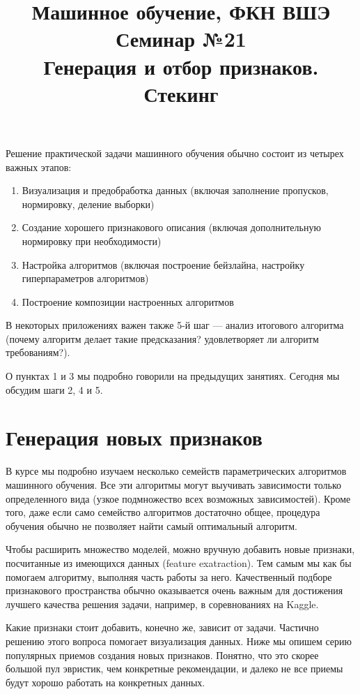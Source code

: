 \documentclass[12pt,a4paper]{article}
\title{Машинное обучение, ФКН ВШЭ\\Семинар №21\\Генерация и отбор признаков. Стекинг}
\author{}
\date{}
\begin{document}
	\maketitle
	Решение практической задачи машинного обучения обычно состоит из четырех  важных этапов:
	\begin{enumerate}
		\item Визуализация и предобработка данных (включая заполнение пропусков, нормировку, деление выборки)
		\item Создание хорошего признакового описания (включая дополнительную нормировку при необходимости)
		\item Настройка алгоритмов (включая построение бейзлайна, настройку гиперпараметров алгоритмов)
		\item Построение композиции настроенных алгоритмов
	\end{enumerate}
    В некоторых приложениях важен также 5-й шаг --- анализ итогового алгоритма (почему алгоритм делает такие предсказания? удовлетворяет ли алгоритм требованиям?).
    
    О пунктах 1 и 3 мы подробно говорили на предыдущих занятиях. Сегодня мы обсудим шаги 2, 4 и 5.
    
	\section{Генерация новых признаков}
	В курсе мы подробно изучаем несколько семейств параметрических алгоритмов машинного обучения. Все эти алгоритмы могут выучивать зависимости только определенного вида (узкое подмножество всех возможных зависимостей). Кроме того, даже если само семейство алгоритмов достаточно общее, процедура обучения обычно не позволяет найти самый оптимальный алгоритм. 
	
	Чтобы расширить множество моделей, можно вручную добавить новые признаки, посчитанные из имеющихся данных (feature exatraction). Тем самым мы как бы помогаем алгоритму, выполняя часть работы за него. Качественный подборе признакового пространства обычно оказывается очень важным для достижения лучшего качества решения задачи, например, в соревнованиях на Kaggle.
	
	 Какие признаки стоит добавить, конечно же, зависит от задачи. Частично решению этого вопроса помогает визуализация данных. Ниже мы опишем серию популярных приемов создания новых признаков. Понятно, что это скорее большой пул эвристик, чем конкретные рекомендации, и далеко не все приемы будут хорошо работать на конкретных данных.
	 
\end{document}
